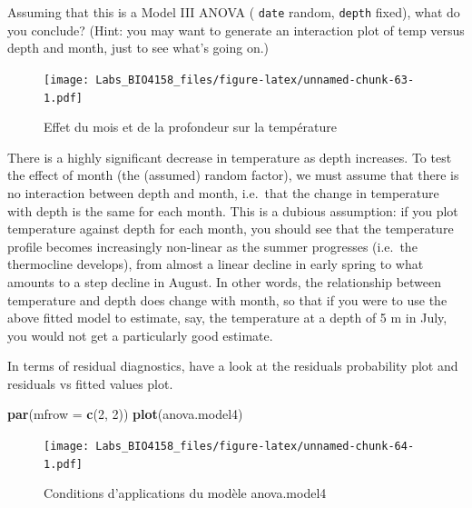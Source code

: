 \documentclass[
  12pt,
]{book}
\newenvironment{Shaded}{\begin{snugshade}}{\end{snugshade}}
\newcommand{\DataTypeTok}[1]{\textcolor[rgb]{0.13,0.29,0.53}{#1}}
\newcommand{\DecValTok}[1]{\textcolor[rgb]{0.00,0.00,0.81}{#1}}
\newcommand{\KeywordTok}[1]{\textcolor[rgb]{0.13,0.29,0.53}{\textbf{#1}}}
\newcommand{\NormalTok}[1]{#1}
\newcommand{\OperatorTok}[1]{\textcolor[rgb]{0.81,0.36,0.00}{\textbf{#1}}}
\begin{document}
Assuming that this is a Model III ANOVA ( \texttt{date} random, \texttt{depth} fixed), what do you conclude? (Hint: you may want to generate an interaction plot of temp versus depth and month, just to see what's going on.)

\begin{Shaded}
\end{Shaded}

\begin{figure}
\centering
\texttt{[image: Labs\_BIO4158\_files/figure-latex/unnamed-chunk-63-1.pdf]}
\caption{\label{fig:unnamed-chunk-63}Effet du mois et de la profondeur sur la température}
\end{figure}

There is a highly significant decrease in temperature as depth increases. To test the effect of month (the (assumed) random factor), we must assume that there is no interaction between depth and month, i.e.~that the change in temperature with depth is the same for each month. This is a dubious assumption: if you plot temperature against depth for each month, you should see that the temperature profile becomes increasingly non-linear as the summer progresses (i.e.~the thermocline develops), from almost a linear decline in early spring to what amounts to a step decline in August. In other words, the relationship between temperature and depth does change with month, so that if you were to use the above fitted model to estimate, say, the temperature at a depth of 5 m in July, you would not get a particularly good estimate.

In terms of residual diagnostics, have a look at the residuals probability plot and residuals vs fitted values plot.

\begin{Shaded}
\begin{Highlighting}[]
\KeywordTok{par}\NormalTok{(}\DataTypeTok{mfrow =} \KeywordTok{c}\NormalTok{(}\DecValTok{2}\NormalTok{, }\DecValTok{2}\NormalTok{))}
\KeywordTok{plot}\NormalTok{(anova.model4)}
\end{Highlighting}
\end{Shaded}

\begin{figure}
\centering
\texttt{[image: Labs\_BIO4158\_files/figure-latex/unnamed-chunk-64-1.pdf]}
\caption{\label{fig:unnamed-chunk-64}Conditions d'applications du modèle anova.model4}
\end{figure}
\end{document}

